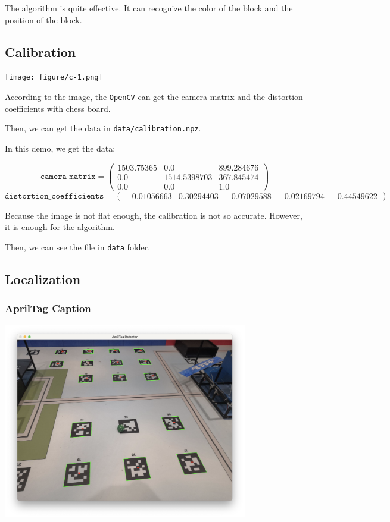 \documentclass{article}
\begin{document}
The algorithm is quite effective. It can recognize the color of the block and the position of the block.

\subsection{Calibration}

\texttt{[image: figure/c-1.png]}

According to the image, the \texttt{OpenCV} can get the camera matrix and the distortion coefficients with chess board.

Then, we can get the data in \texttt{data/calibration.npz}.

In this demo, we get the data:

\[
  \texttt{camera\_matrix}=\left(\begin{matrix}
    1503.75365 & 0.0 & 899.284676 \\
    0.0 & 1514.5398703 & 367.845474 \\
    0.0 & 0.0 & 1.0
  \end{matrix}\right)
\]
\[
  \texttt{distortion\_coefficients}=\left(\begin{matrix}
    -0.01056663 & 0.30294403 & -0.07029588 & -0.02169794 & -0.44549622
  \end{matrix}\right)
\]

Because the image is not flat enough, the calibration is not so accurate. However, it is enough for the algorithm.

Then, we can see the file in \texttt{data} folder.

\subsection{Localization}

\subsubsection{AprilTag Caption}

\includegraphics[width=0.8\textwidth]{figure/l-1.png}
\end{document}
